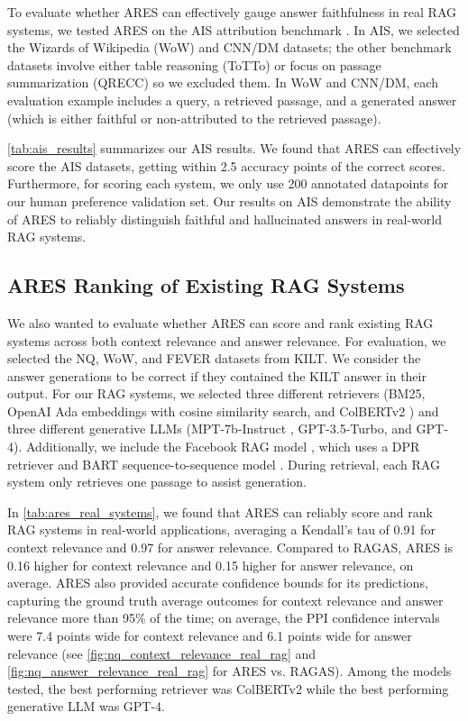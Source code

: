 To evaluate whether ARES can effectively gauge answer faithfulness in real RAG systems, we tested ARES on the AIS attribution benchmark \cite{rashkin2022measuring}. 
In AIS, we selected the Wizards of Wikipedia (WoW) and CNN/DM datasets; the other benchmark datasets involve either table reasoning (ToTTo) or focus on passage summarization (QRECC) so we excluded them.
In WoW and CNN/DM, each evaluation example includes a query, a retrieved passage, and a generated answer (which is either faithful or non-attributed to the retrieved passage).

\autoref{tab:ais_results} summarizes our AIS results. We found that ARES can effectively score the AIS datasets, getting within 2.5 accuracy points of the correct scores. Furthermore, for scoring each system, we only use 200 annotated datapoints for our human preference validation set.
Our results on AIS demonstrate the ability of ARES to reliably distinguish faithful and hallucinated answers in real-world RAG systems.

\subsection{ARES Ranking of Existing RAG Systems}



We also wanted to evaluate whether ARES can score and rank existing RAG systems across both context relevance and answer relevance. 
For evaluation, we selected the NQ, WoW, and FEVER datasets from KILT.
We consider the answer generations to be correct if they contained the KILT answer in their output.
For our RAG systems, we selected three different retrievers (BM25, OpenAI Ada embeddings with cosine similarity search, and ColBERTv2 \cite{santhanam-etal-2022-colbertv2}) and three different generative LLMs (MPT-7b-Instruct \cite{MosaicML2023Introducing}, GPT-3.5-Turbo, and GPT-4).
Additionally, we include the Facebook RAG model \cite{lewis2020retrieval}, which uses a DPR retriever \cite{karpukhin2020dense} and BART sequence-to-sequence model \cite{lewis2019bart}. 
During retrieval, each RAG system only retrieves one passage to assist generation.

In \autoref{tab:ares_real_systems}, we found that ARES can reliably score and rank RAG systems in real-world applications, averaging a Kendall's tau of 0.91 for context relevance and 0.97 for answer relevance.
Compared to RAGAS, ARES is 0.16 higher for context relevance and 0.15 higher for answer relevance, on average.
ARES also provided accurate confidence bounds for its predictions, capturing the ground truth average outcomes for context relevance and answer relevance more than 95\% of the time; on average, the PPI confidence intervals were 7.4 points wide for context relevance and 6.1 points wide for answer relevance (see \autoref{fig:nq_context_relevance_real_rag} and \autoref{fig:nq_answer_relevance_real_rag} for ARES vs. RAGAS).
Among the models tested, the best performing retriever was ColBERTv2 while the best performing generative LLM was GPT-4.







